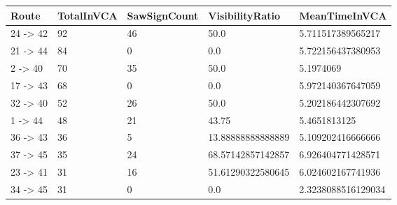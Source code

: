\begin{tabular}{lllll}
\hline
Route & TotalInVCA & SawSignCount & VisibilityRatio & MeanTimeInVCA \\ \hline
24 -> 42 & 92 & 46 & 50.0 & 5.711517389565217 \\
21 -> 44 & 84 & 0 & 0.0 & 5.722156437380953 \\
2 -> 40 & 70 & 35 & 50.0 & 5.1974069 \\
17 -> 43 & 68 & 0 & 0.0 & 5.972140367647059 \\
32 -> 40 & 52 & 26 & 50.0 & 5.202186442307692 \\
1 -> 44 & 48 & 21 & 43.75 & 5.4651813125 \\
36 -> 43 & 36 & 5 & 13.88888888888889 & 5.109202416666666 \\
37 -> 45 & 35 & 24 & 68.57142857142857 & 6.926404771428571 \\
23 -> 41 & 31 & 16 & 51.61290322580645 & 6.024602167741936 \\
34 -> 45 & 31 & 0 & 0.0 & 2.3238088516129034 \\
\hline
\end{tabular}
